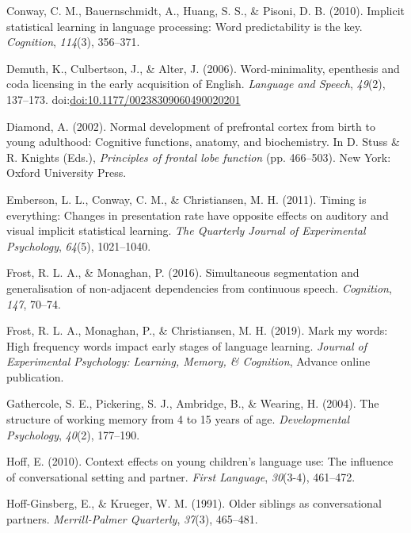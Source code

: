 \documentclass[man,mask,floatsintext]{apa6}
\theoremstyle{definition}
\theoremstyle{definition}
\theoremstyle{definition}
\theoremstyle{remark}
\begin{document}
\hypertarget{ref-conway2010implicit}{}
Conway, C. M., Bauernschmidt, A., Huang, S. S., \& Pisoni, D. B. (2010).
Implicit statistical learning in language processing: Word
predictability is the key. \emph{Cognition}, \emph{114}(3), 356--371.

\hypertarget{ref-demuth2006word}{}
Demuth, K., Culbertson, J., \& Alter, J. (2006). Word-minimality,
epenthesis and coda licensing in the early acquisition of English.
\emph{Language and Speech}, \emph{49}(2), 137--173.
doi:\href{https://doi.org/doi:10.1177/00238309060490020201}{doi:10.1177/00238309060490020201}

\hypertarget{ref-diamond2002normal}{}
Diamond, A. (2002). Normal development of prefrontal cortex from birth
to young adulthood: Cognitive functions, anatomy, and biochemistry. In
D. Stuss \& R. Knights (Eds.), \emph{Principles of frontal lobe
function} (pp. 466--503). New York: Oxford University Press.

\hypertarget{ref-emberson2011timing}{}
Emberson, L. L., Conway, C. M., \& Christiansen, M. H. (2011). Timing is
everything: Changes in presentation rate have opposite effects on
auditory and visual implicit statistical learning. \emph{The Quarterly
Journal of Experimental Psychology}, \emph{64}(5), 1021--1040.

\hypertarget{ref-frost2016simultaneous}{}
Frost, R. L. A., \& Monaghan, P. (2016). Simultaneous segmentation and
generalisation of non-adjacent dependencies from continuous speech.
\emph{Cognition}, \emph{147}, 70--74.

\hypertarget{ref-frost2019}{}
Frost, R. L. A., Monaghan, P., \& Christiansen, M. H. (2019). Mark my
words: High frequency words impact early stages of language learning.
\emph{Journal of Experimental Psychology: Learning, Memory, \&
Cognition}, Advance online publication.

\hypertarget{ref-gathercole2004structure}{}
Gathercole, S. E., Pickering, S. J., Ambridge, B., \& Wearing, H.
(2004). The structure of working memory from 4 to 15 years of age.
\emph{Developmental Psychology}, \emph{40}(2), 177--190.

\hypertarget{ref-hoff2010context}{}
Hoff, E. (2010). Context effects on young children's language use: The
influence of conversational setting and partner. \emph{First Language},
\emph{30}(3-4), 461--472.

\hypertarget{ref-hoff1991older}{}
Hoff-Ginsberg, E., \& Krueger, W. M. (1991). Older siblings as
conversational partners. \emph{Merrill-Palmer Quarterly}, \emph{37}(3),
465--481.
\end{document}
